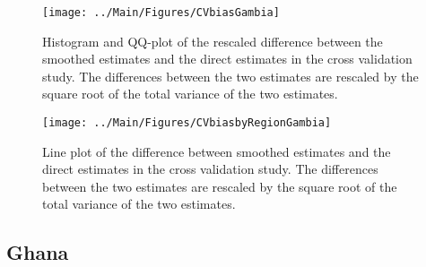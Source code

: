 \documentclass[12pt]{article}\usepackage[]{graphicx}\usepackage[]{color}
\newenvironment{knitrout}{}{} %
\begin{document}
\begin{knitrout}
\color{fgcolor}\begin{figure}[bht]

{\centering \texttt{[image: ../Main/Figures/CVbiasGambia]} 

}

\caption[Histogram and QQ-plot of the rescaled difference between the smoothed estimates and the direct estimates in the cross validation study]{Histogram and QQ-plot of the rescaled difference between the smoothed estimates and the direct estimates in the cross validation study. The differences between the two estimates are rescaled by the square root of the total variance of the two estimates.}\label{fig:unnamed-chunk-139}
\end{figure}


\end{knitrout}

\begin{knitrout}
\color{fgcolor}\begin{figure}[bht]

{\centering \texttt{[image: ../Main/Figures/CVbiasbyRegionGambia]} 

}

\caption[Line plot of the difference between smoothed estimates and the direct estimates in the cross validation study]{Line plot of the difference between smoothed estimates and the direct estimates in the cross validation study. The differences between the two estimates are rescaled by the square root of the total variance of the two estimates.}\label{fig:unnamed-chunk-140}
\end{figure}


\end{knitrout}


\clearpage
\subsection{Ghana}


\end{document}
